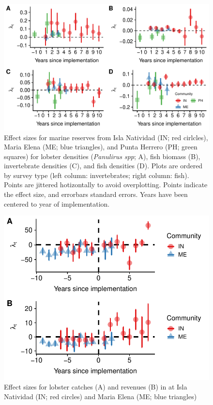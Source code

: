 \documentclass{frontiersSCNS}
\theoremstyle{definition}
\theoremstyle{definition}
\theoremstyle{definition}
\theoremstyle{remark}
\begin{document}
\clearpage

\begin{figure}
\centering
\includegraphics{Villasenor-Derbez_files/figure-latex/unnamed-chunk-5-1.pdf}
\caption{\label{fig:unnamed-chunk-5}\label{fig:indicators}Effect sizes for
marine reserves from Isla Natividad (IN; red cirlcles), Maria Elena (ME;
blue triangles), and Punta Herrero (PH; green squares) for lobster
densities (\emph{Panulirus spp}; A), fish biomass (B), invertebrate
densities (C), and fish densities (D). Plots are ordered by survey type
(left column: invertebrates; right column: fish). Points are jittered
hotizontally to avoid overplotting. Points indicate the effect size, and
errorbars standard errors. Years have been centered to year of
implementation.}
\end{figure}

\begin{figure}
\centering
\includegraphics{Villasenor-Derbez_files/figure-latex/unnamed-chunk-7-1.pdf}
\caption{\label{fig:unnamed-chunk-7}\label{fig:lobsters}Effect sizes for
lobster catches (A) and revenues (B) in at Isla Natividad (IN; red
circles) and Maria Elena (ME; blue triangles)}
\end{figure}
\end{document}
